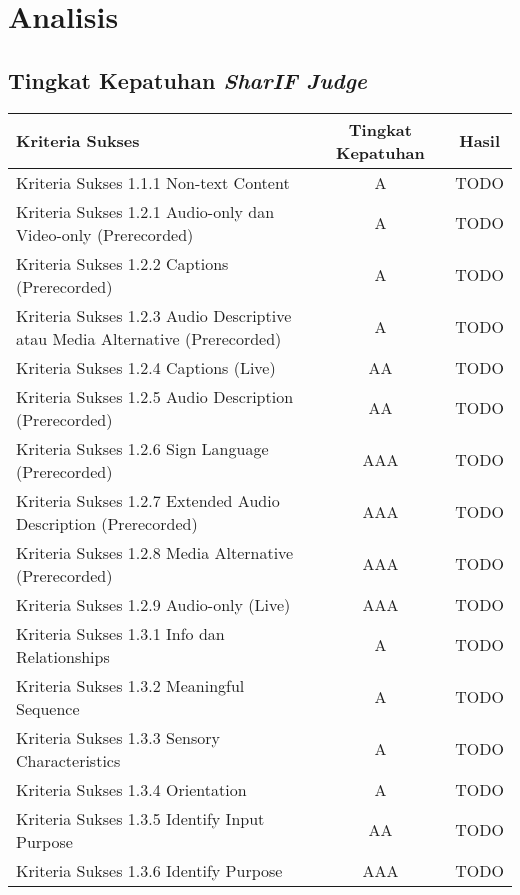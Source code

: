 \chapter{Analisis}
\label{chap:analisis}

\section{Tingkat Kepatuhan \textit{SharIF Judge}}

\begin{table}[H]
	\centering
	\begin{tabular}{|l|c|c|}
		\hline
		Kriteria Sukses & Tingkat Kepatuhan & Hasil \\
		\hline
		Kriteria Sukses 1.1.1 Non-text Content & A & TODO \\
		Kriteria Sukses 1.2.1 Audio-only dan Video-only (Prerecorded) & A & TODO \\
		Kriteria Sukses 1.2.2 Captions (Prerecorded) & A & TODO \\
		Kriteria Sukses 1.2.3 Audio Descriptive atau Media Alternative (Prerecorded) & A & TODO \\
		Kriteria Sukses 1.2.4 Captions (Live) & AA & TODO \\
		Kriteria Sukses 1.2.5 Audio Description (Prerecorded) & AA & TODO \\
		Kriteria Sukses 1.2.6 Sign Language (Prerecorded) & AAA & TODO \\
		Kriteria Sukses 1.2.7 Extended Audio Description (Prerecorded) & AAA & TODO \\
		Kriteria Sukses 1.2.8 Media Alternative (Prerecorded) & AAA & TODO \\
		Kriteria Sukses 1.2.9 Audio-only (Live) & AAA & TODO \\
		Kriteria Sukses 1.3.1 Info dan Relationships & A & TODO \\
		Kriteria Sukses 1.3.2 Meaningful Sequence & A & TODO \\
		Kriteria Sukses 1.3.3 Sensory Characteristics & A & TODO \\
		Kriteria Sukses 1.3.4 Orientation & A & TODO \\
		Kriteria Sukses 1.3.5 Identify Input Purpose & AA & TODO \\
		Kriteria Sukses 1.3.6 Identify Purpose & AAA & TODO \\
		\hline
	\end{tabular}
\end{table}